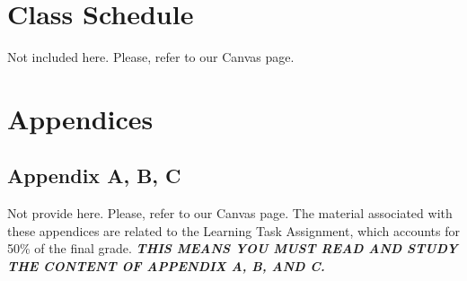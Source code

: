 \documentclass[11pt,]{article}
\begin{document}
\hypertarget{class-schedule}{%
\section{Class Schedule}\label{class-schedule}}

Not included here. Please, refer to our Canvas page.

\hypertarget{appendices}{%
\section{Appendices}\label{appendices}}

\hypertarget{appendix-a-b-c}{%
\subsection{Appendix A, B, C}\label{appendix-a-b-c}}

Not provide here. Please, refer to our Canvas page. The material
associated with these appendices are related to the Learning Task
Assignment, which accounts for 50\% of the final grade.
\textbf{\emph{THIS MEANS YOU MUST READ AND STUDY THE CONTENT OF APPENDIX
A, B, AND C.}}
\end{document}
